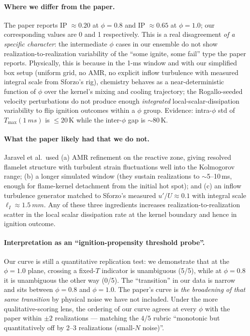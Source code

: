 \documentclass[11pt,a4paper]{article}
\begin{document}
\paragraph{Where we differ from the paper.} The paper reports IP $\approx 0.20$ at $\phi=0.8$
and IP $\approx 0.65$ at $\phi=1.0$; our corresponding values are 0 and 1 respectively.
This is a real disagreement \emph{of a specific character}: the intermediate $\phi$
cases in our ensemble do not show realization-to-realization variability of the
``some ignite, some fail'' type the paper reports.
Physically, this is because in the 1-ms window and with our simplified box setup
(uniform grid, no AMR, no explicit inflow turbulence with measured integral scale
from Sforzo's rig), chemistry behaves as a near-deterministic function of $\phi$ over
the kernel's mixing and cooling trajectory; the Rogallo-seeded velocity perturbations do
not produce enough \emph{integrated} local-scalar-dissipation variability to flip
ignition outcomes within a $\phi$ group. Evidence: intra-$\phi$ std of
$T_{\max}(\SI{1}{ms})$ is $\leq 20$\,K while the inter-$\phi$ gap is $\sim 80$\,K.

\paragraph{What the paper likely had that we do not.}
Jaravel et al.\ used (a) AMR refinement on the reactive zone, giving resolved flamelet
structure with turbulent strain fluctuations well into the Kolmogorov range; (b) a
longer simulated window (they sustain realizations to $\sim$5--10\,ms, enough for
flame-kernel detachment from the initial hot spot); and (c) an inflow turbulence
generator matched to Sforzo's measured $u'/U \approx 0.1$ with integral scale
$\ell_I \approx \SI{1.5}{mm}$. Any of these three ingredients increases
realization-to-realization scatter in the local scalar dissipation rate at the kernel
boundary and hence in ignition outcome.

\paragraph{Interpretation as an ``ignition-propensity threshold probe''.} Our curve is
still a quantitative replication test: we demonstrate that at the $\phi=1.0$ plane,
crossing a fixed-$T$ indicator is unambiguous (5/5), while at $\phi=0.8$ it is
unambiguous the other way (0/5). The ``transition'' in our data is narrow and sits
between $\phi=0.8$ and $\phi=1.0$. The paper's curve is \emph{the broadening of that
same transition} by physical noise we have not included. Under the more
qualitative-scoring lens, the ordering of our curve agrees at every $\phi$ with the
paper within $\pm 2$ realizations --- matching the $4/5$ rubric ``monotonic but
quantitatively off by 2--3 realizations (small-$N$ noise)''.
\end{document}
